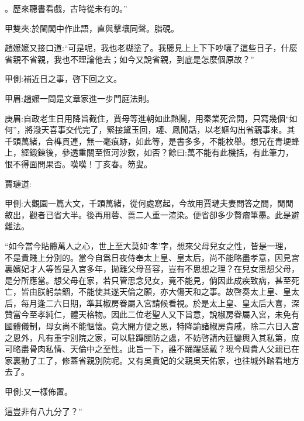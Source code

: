 \begin{parag}
。歷來聽書看戲，古時從未有的。”\begin{note}甲雙夾:於閨閣中作此語，直與擊壤同聲。脂硯。\end{note}趙嬤嬤又接口道:“可是呢，我也老糊塗了。我聽見上上下下吵嚷了這些日子，什麼省親不省親，我也不理論他去；如今又說省親，到底是怎麼個原故？”\begin{note}甲側:補近日之事，啓下回之文。\end{note}\begin{note}甲眉:趙嬤一問是文章家進一步門庭法則。\end{note}\begin{note}庚眉:自政老生日用降旨截住，賈母等進朝如此熱鬧，用秦業死岔開，只寫幾個“如何”，將潑天喜事交代完了，緊接黛玉回，璉、鳳閒話，以老嫗勾出省親事來。其千頭萬緒，合榫貫連，無一毫痕跡，如此等，是書多多，不能枚舉。想兄在青埂蜂上，經鍛鍊後，參透重關至恆河沙數，如否？餘曰:萬不能有此機括，有此筆力，恨不得面問果否。嘆嘆！丁亥春。笏叟。\end{note}賈璉道:\begin{note}甲側:大觀園一篇大文，千頭萬緒，從何處寫起，今故用賈璉夫妻問答之間，閒閒敘出，觀者已省大半。後再用蓉、薔二人重一渲染。便省卻多少贅瘤筆墨。此是避難法。\end{note}“如今當今貼體萬人之心，世上至大莫如‘孝’字，想來父母兒女之性，皆是一理，不是貴賤上分別的。當今自爲日夜侍奉太上皇、皇太后，尚不能略盡孝意，因見宮裏嬪妃才人等皆是入宮多年，拋離父母音容，豈有不思想之理？在兒女思想父母，是分所應當。想父母在家，若只管思念兒女，竟不能見，倘因此成疾致病，甚至死亡，皆由朕躬禁錮，不能使其遂天倫之願，亦大傷天和之事。故啓奏太上皇、皇太后，每月逢二六日期，準其椒房眷屬入宮請候看視。於是太上皇、皇太后大喜，深贊當今至孝純仁，體天格物。因此二位老聖人又下旨意，說椒房眷屬入宮，未免有國體儀制，母女尚不能愜懷。竟大開方便之恩，特降諭諸椒房貴戚，除二六日入宮之恩外，凡有重宇別院之家，可以駐蹕關防之處，不妨啓請內廷鑾輿入其私第，庶可略盡骨肉私情、天倫中之至性。此旨一下，誰不踊躍感戴？現今周貴人父親已在家裏動了工了，修蓋省親別院呢。又有吳貴妃的父親吳天佑家，也往城外踏看地方去了。\begin{note}甲側:又一樣佈置。\end{note}這豈非有八九分了？”
\end{parag}


